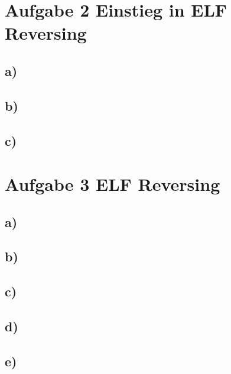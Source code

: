 \section*{Aufgabe 2 Einstieg in ELF Reversing}

\subsection*{a)}

\subsection*{b)}

\subsection*{c)}

\section*{Aufgabe 3 ELF Reversing}

\subsection*{a)}

\subsection*{b)}

\subsection*{c)}

\subsection*{d)}

\subsection*{e)}

